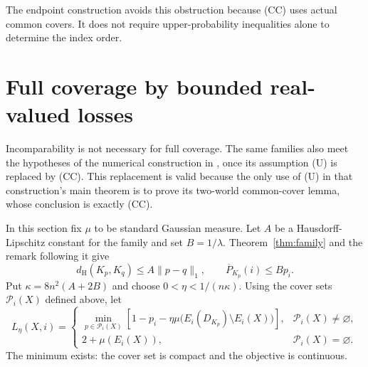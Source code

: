 \documentclass[11pt]{article}
\theoremstyle{remark}
\newcommand{\dH}{d_{\mathrm H}}
\newcommand{\hi}{\overline P}
\begin{document}
The endpoint construction avoids this obstruction because (CC) uses actual
common covers. It does not require upper-probability inequalities alone to
determine the index order.

\section{Full coverage by bounded real-valued losses}

Incomparability is not necessary for full coverage. The same families also
meet the hypotheses of the numerical construction in \cite{LR}, once its
assumption (U) is replaced by (CC). This replacement is valid because the
only use of (U) in that construction's main theorem is to prove its
two-world common-cover lemma, whose conclusion is exactly (CC).

In this section fix $\mu$ to be standard Gaussian measure. Let $A$ be a
Hausdorff-Lipschitz constant for the family and set $B=1/\lambda$.
Theorem~\ref{thm:family} and the remark following it give
\[
 \dH(K_p,K_q)\le A\|p-q\|_1,
 \qquad \hi_{K_p}(i)\le Bp_i.
\]
Put $\kappa=8n^2(A+2B)$ and choose $0<\eta<1/(n\kappa)$.
Using the cover sets $\mathcal P_i(X)$ defined above, let
\[
 L_\eta(X,i)=
 \begin{cases}
 \displaystyle\min_{p\in\mathcal P_i(X)}
 \left[1-p_i-\eta\mu\big(E_i(D_{K_p})\setminus E_i(X)\big)\right],
       &\mathcal P_i(X)\ne\varnothing,\\[3pt]
 2+\mu(E_i(X)),&\mathcal P_i(X)=\varnothing.
 \end{cases}
 \tag{10}\label{eq:finite-loss}
\]
The minimum exists: the cover set is compact and the objective is continuous.
\end{document}
